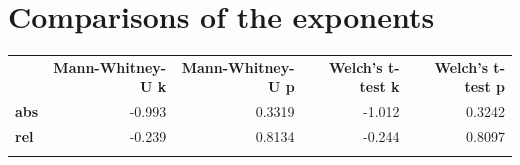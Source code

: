 \FloatBarrier
\section{Comparisons of the exponents}

\begin{longtable}[c]{@{}lrrrr@{}}
\toprule\addlinespace
& \textbf{Mann-Whitney-U k} & \textbf{Mann-Whitney-U p} &
\textbf{Welch's t-test k} & \textbf{Welch's t-test p}
\\\addlinespace
\midrule\endhead
\textbf{abs} & -0.993 & 0.3319 & -1.012 & 0.3242
\\\addlinespace
\textbf{rel} & -0.239 & 0.8134 & -0.244 & 0.8097
\\\addlinespace
\bottomrule
    \label{tab:exponent_comp}
\end{longtable}

